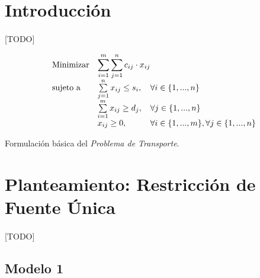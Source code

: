 \documentclass[a4paper, spanish]{article}
\begin{document}
  \maketitle

  \begin{abstract}
    \noindent [TODO]
  \end{abstract}


  \section{Introducción}
  \label{sec:introduction}

    \paragraph{}
    [TODO]


    \begin{eqfloat}
      \begin{equation}
        \begin{array}{ll@{}ll}
          \text{Minimizar}	& \displaystyle \sum\limits_{i=1}^{m}\sum\limits_{j=1}^{n}c_{ij} \cdot x_{ij} \\
          \text{sujeto a}		& \sum\limits_{j=1}^{n} x_{ij}	\leq s_{i}, & \forall i \in \{1,...,n\}\\
                            &	\sum\limits_{i=1}^{m} x_{ij}	\geq d_{j}, & \forall j \in \{1,...,n\} \\
                            & x_{ij}	\geq 0, 	& \forall i \in \{1,...,m\}, \forall j \in \{1,...,n\}
        \end{array}
      \end{equation}
      \caption{Formulación básica del \emph{Problema de Transporte}.}
      \label{eq:transportation-model}
    \end{eqfloat}

  \section{Planteamiento: Restricción de Fuente Única}
  \label{sec:approach}

    \paragraph{}
    [TODO]

    \subsection{Modelo 1}
    \label{sec:approach-1}
\end{document}
